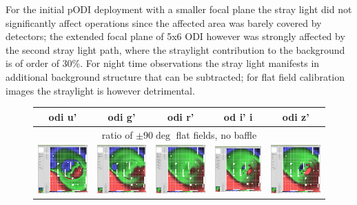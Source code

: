 \documentclass[]{spieman}
\begin{document}
For the initial pODI deployment with a smaller focal plane the stray light did
not significantly affect operations since the affected area was barely covered by 
detectors; the extended focal plane of 5x6 ODI however was
strongly affected by the second stray light path, where the straylight contribution
to the background is of order of 30\%. For night time
observations the stray light manifests in additional background structure that
can be subtracted; for flat field calibration images the straylight is however 
detrimental. 

	\begin{figure} 
		\centering

		\begin{tabular}{ccccc} odi u' & odi g' & odi r' & od i'
			i & odi z' \\ \hline \multicolumn{5}{c}{ratio of $\pm 90 \deg$ 
				flat
				fields, no baffle} \\[1ex]
			
			\includegraphics[width=0.18\columnwidth]{images/nobaffle_u.jpeg}
			&
			\includegraphics[width=0.18\columnwidth]{images/nobaffle_g.jpeg}
			&
			\includegraphics[width=0.18\columnwidth]{images/nobaffle_r.jpeg}
			&
			\includegraphics[width=0.18\columnwidth]{images/nobaffle_i.jpeg}
			&
			\includegraphics[width=0.18\columnwidth]{images/nobaffle_z.jpeg}
			\\[2ex]
			

\end{tabular}
\end{figure}
\end{document}
